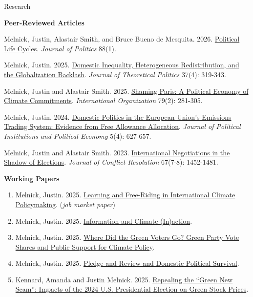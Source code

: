 \documentclass{resume} %
\begin{document}
\begin{rSection}{Research}

\textbf{Peer-Reviewed Articles}
\begin{etaremune}
 \item Melnick, Justin, Alastair Smith, and Bruce Bueno de Mesquita. 2026. \href{https://justinmelnick.github.io/papers/plc/paper.pdf}{Political Life Cycles}.  \textit{Journal of Politics} 88(1).
           \item Melnick, Justin. 2025. \href{https://justinmelnick.github.io/papers/exit/paper.pdf}{Domestic Inequality, Heterogeneous Redistribution, and the Globalization Backlash}.  \textit{Journal of Theoretical Politics} 37(4): 319-343.
            \item Melnick, Justin and Alastair Smith. 2025. \href{https://justinmelnick.github.io/papers/paris/paper.pdf}{Shaming Paris: A Political Economy of Climate Commitments}. \textit{International Organization} 79(2): 281-305.
\item Melnick, Justin. 2024. \href{https://justinmelnick.github.io/papers/ets/paper.pdf}{Domestic Politics in the European Union’s Emissions Trading System: Evidence from Free Allowance Allocation}. \textit{Journal of Political Institutions and Political Economy} 5(4): 627-657.
    \item Melnick, Justin and Alastair Smith. 2023. \href{https://justinmelnick.github.io/papers/nego/paper.pdf}{International Negotiations in the Shadow of Elections}.  \textit{Journal of Conflict Resolution} 67(7-8): 1452-1481.
\end{etaremune}

\textbf{Working Papers}
\begin{enumerate}
 \item Melnick, Justin. 2025. \href{https://justinmelnick.github.io/papers/complementarities/paper.pdf}{Learning and Free-Riding in International Climate Policymaking}. (\textit{job market paper})
                    \item Melnick, Justin. 2025. \href{https://justinmelnick.github.io/papers/inaction/paper.pdf}{Information and Climate (In)action}.
                        \item Melnick, Justin. 2025. \href{https://justinmelnick.github.io/papers/greens/paper.pdf}{Where Did the Green Voters Go? Green Party Vote Shares and Public Support for Climate Policy}.
                        \item Melnick, Justin. 2025. \href{https://justinmelnick.github.io/papers/pledge/paper.pdf}{Pledge-and-Review and Domestic Political Survival}.                        
                        \item Kennard, Amanda and Justin Melnick. 2025. \href{https://justinmelnick.github.io/papers/scam/paper.pdf}{Repealing the ``Green New Scam'': Impacts of the 2024 U.S. Presidential Election on Green Stock Prices}. 
\end{enumerate}


\end{rSection}
\end{document}
